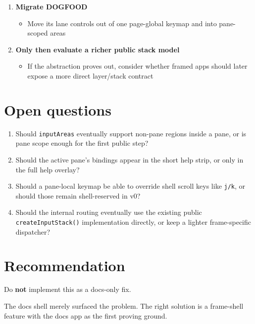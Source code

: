\begin{enumerate}
  \begin{itemize}
  \tightlist
  \item
    Click-to-focus
  \item
    wheel-to-focus-and-scroll
  \item
    pane-local click dispatch after shell interception
  \end{itemize}
\item
  \textbf{Migrate DOGFOOD}

  \begin{itemize}
  \tightlist
  \item
    Move its lane controls out of one page-global keymap and into pane-scoped areas
  \end{itemize}
\item
  \textbf{Only then evaluate a richer public stack model}

  \begin{itemize}
  \tightlist
  \item
    If the abstraction proves out, consider whether framed apps should later expose a more direct layer/stack contract
  \end{itemize}
\end{enumerate}

\section{Open questions}\label{record-044-open-questions}

\begin{enumerate}
\def\labelenumi{\arabic{enumi}.}
\tightlist
\item
  Should \texttt{i\allowbreak{}n\allowbreak{}p\allowbreak{}u\allowbreak{}t\allowbreak{}A\allowbreak{}r\allowbreak{}e\allowbreak{}a\allowbreak{}s} eventually support non-pane regions inside a pane, or is pane scope enough for the first public step?
\item
  Should the active pane's bindings appear in the short help strip, or only in the full help overlay?
\item
  Should a pane-local keymap be able to override shell scroll keys like \texttt{j\allowbreak{}/\allowbreak{}k}, or should those remain shell-reserved in v0?
\item
  Should the internal routing eventually use the existing public \texttt{c\allowbreak{}r\allowbreak{}e\allowbreak{}a\allowbreak{}t\allowbreak{}e\allowbreak{}I\allowbreak{}n\allowbreak{}p\allowbreak{}u\allowbreak{}t\allowbreak{}S\allowbreak{}t\allowbreak{}a\allowbreak{}c\allowbreak{}k\allowbreak{}(\allowbreak{})} implementation directly, or keep a lighter frame-specific dispatcher?
\end{enumerate}

\section{Recommendation}\label{record-044-recommendation}

Do \textbf{not} implement this as a docs-only fix.

The docs shell merely surfaced the problem. The right solution is a frame-shell feature with the docs app as the first proving ground.

